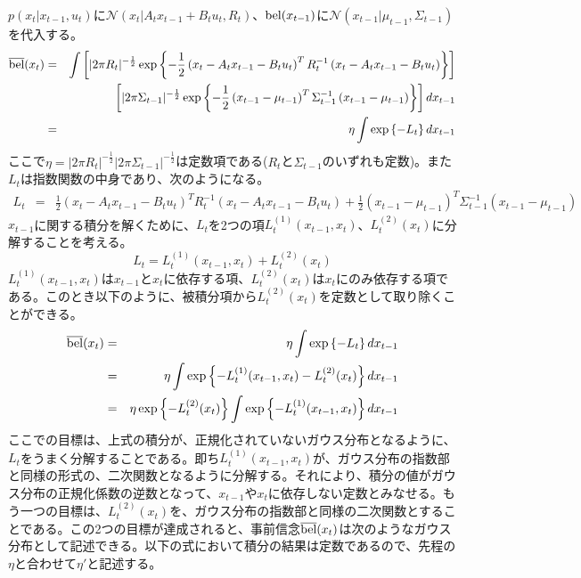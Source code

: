 \documentclass[dvipdfmx,a4paper]{jsarticle}
\begin{document}
$p(x_t | x_{t - 1}, u_t)$に$\mathcal{N}(x_t | A_t x_{t - 1} + B_t u_t, R_t)$、$\operatorname{bel}(x_{t - 1})$に$\mathcal{N}(x_{t - 1} | \mu_{t - 1}, \Sigma_{t - 1})$を代入する。
\begin{eqnarray}
	\operatorname{\overline{bel}}(x_t) &=& \int \left[ | 2 \pi R_t |^{-\frac{1}{2}} \exp \left\{ -\frac{1}{2} \left( x_t - A_t x_{t - 1} - B_t u_t \right)^T R_t^{-1} \left( x_t - A_t x_{t - 1} - B_t u_t \right) \right\} \right] \nonumber \\
	&& \qquad \left[ | 2 \pi \Sigma_{t - 1} |^{-\frac{1}{2}} \exp \left\{ -\frac{1}{2} \left( x_{t - 1} - \mu_{t - 1} \right)^T \Sigma_{t - 1}^{-1} \left( x_{t - 1} - \mu_{t - 1} \right) \right\} \right] dx_{t - 1} \\
	&=& \eta \int \exp \left\{ - L_t \right\} dx_{t - 1}
\end{eqnarray}
ここで$\eta = |2 \pi R_t|^{-\frac{1}{2}} |2 \pi \Sigma_{t - 1}|^{-\frac{1}{2}}$は定数項である($R_t$と$\Sigma_{t - 1}$のいずれも定数)。また$L_t$は指数関数の中身であり、次のようになる。
\begin{eqnarray}
	L_t &=& \frac{1}{2} \left( x_t - A_t x_{t - 1} - B_t u_t \right)^T R_t^{-1} \left( x_t - A_t x_{t - 1} - B_t u_t \right) + \frac{1}{2} \left( x_{t - 1} - \mu_{t - 1} \right)^T \Sigma_{t - 1}^{-1} \left( x_{t - 1} - \mu_{t - 1} \right)
\end{eqnarray}
$x_{t - 1}$に関する積分を解くために、$L_t$を2つの項$L_t^{(1)}(x_{t - 1}, x_t)$、$L_t^{(2)}(x_t)$に分解することを考える。
\begin{equation}
	L_t = L_t^{(1)}(x_{t - 1}, x_t) + L_t^{(2)}(x_t)
\end{equation}
$L_t^{(1)}(x_{t - 1}, x_t)$は$x_{t - 1}$と$x_t$に依存する項、$L_t^{(2)}(x_t)$は$x_t$にのみ依存する項である。このとき以下のように、被積分項から$L_t^{(2)}(x_t)$を定数として取り除くことができる。
\begin{eqnarray}
	\operatorname{\overline{bel}}(x_t) &=& \eta \int \exp \left\{ -L_t \right\} dx_{t - 1} \nonumber \\
	&=& \eta \int \exp \left\{ -L_t^{(1)}(x_{t - 1}, x_t) - L_t^{(2)}(x_t) \right\} dx_{t - 1} \nonumber \\
	&=& \eta \exp \left\{ -L_t^{(2)}(x_t) \right\} \int \exp \left\{ -L_t^{(1)}(x_{t - 1}, x_t) \right\} dx_{t - 1}
\end{eqnarray}
ここでの目標は、上式の積分が、正規化されていないガウス分布となるように、$L_t$をうまく分解することである。即ち$L_t^{(1)}(x_{t - 1}, x_t)$が、ガウス分布の指数部と同様の形式の、二次関数となるように分解する。それにより、積分の値がガウス分布の正規化係数の逆数となって、$x_{t - 1}$や$x_t$に依存しない定数とみなせる。もう一つの目標は、$L_t^{(2)}(x_t)$を、ガウス分布の指数部と同様の二次関数とすることである。この2つの目標が達成されると、事前信念$\operatorname{\overline{bel}}(x_t)$は次のようなガウス分布として記述できる。以下の式において積分の結果は定数であるので、先程の$\eta$と合わせて$\eta'$と記述する。
\end{document}
